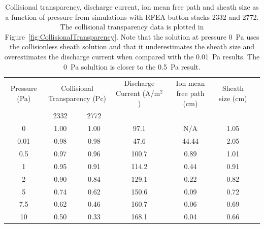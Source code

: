 \begin{table}
\centering
\caption{Collisional transparency, discharge current, ion mean free path and sheath size as a function of pressure from simulations with RFEA button stacks 2332 and 2772. The collisional transparency data is plotted in Figure~\ref{fig:CollisionalTransparency}. Note that the solution at pressure 0~Pa uses the collisionless sheath solution and that it underestimates the sheath size and overestimates the discharge current when compared with the 0.01~Pa results. The 0~Pa solultion is closer to the 0.5~Pa result. }
\label{table:CollisionalTransparency}
\begin{tabular}{c|cc|cccc}
\hline
Pressure (Pa) & \multicolumn{2}{c}{Collisional Transparency (Pc)} & Discharge Current (A/m$^2$) & Ion mean free path (cm) & Sheath size (cm) \\
              & 2332  & 2772 &                                &                      &                \\ \hline
0             & 1.00  & 1.00 & 97.1                           & N/A                  & 1.05           \\ \hline
0.01          & 0.98  & 0.98 & 47.6                           & 44.44                & 2.05           \\
0.5           & 0.97  & 0.96 & 100.7                          & 0.89                 & 1.01           \\
1             & 0.95  & 0.91 & 114.2                          & 0.44                 & 0.91           \\
2             & 0.90  & 0.84 & 129.1                          & 0.22                 & 0.82           \\
5             & 0.74  & 0.62 & 150.6                          & 0.09                 & 0.72           \\
7.5           & 0.62  & 0.46 & 160.7                          & 0.06                 & 0.69           \\
10            & 0.50  & 0.33 & 168.1                          & 0.04                 & 0.66           \\ \hline
\end{tabular}
\end{table}


